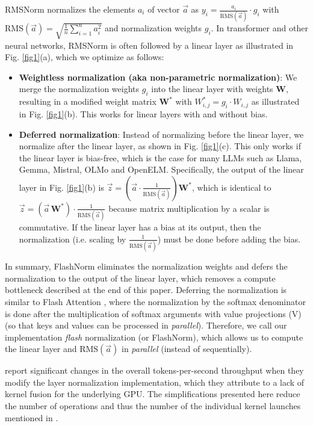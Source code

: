 \documentclass{article}
\newcommand{\mat}[1]{\mathbf{#1}}     %
\def\rms{\text{RMS}(\vec{a})}         %
\def\f1n{\frac{1}{n}}                 %
\def\sas{\sum_{i=1}^n a_i^2}          %
\def\W*{\mat{W}^\ast}                 %
\def\a{\vec{a}}                       %
\def\vz{\vec{z}}                      %
\begin{document}
RMSNorm \citep{rms} normalizes the elements  $a_i$ of vector $\a$ as $y_i = \frac{a_i}{\rms} \cdot g_i$ with $\rms = \sqrt{\f1n \sas}$ and normalization weights $g_i$. In transformer \citep{vanilla} and other neural networks, RMSNorm is often followed by a linear layer as illustrated in Fig. \ref{fig1}(a), which we optimize as follows:
\begin{itemize}[topsep=-1pt]
  \item \textbf{Weightless normalization (aka non-parametric normalization)}: We merge the normalization weights $g_i$ into the linear layer with weights $\mat{W}$, resulting in a modified weight matrix $\W*$ with $W_{i,j}^\ast = g_i \cdot W_{i,j}$ as illustrated in Fig. \ref{fig1}(b). This works for linear layers with and without bias.
  \item \textbf{Deferred normalization}: Instead of normalizing before the linear layer, we normalize after the linear layer, as shown in Fig. \ref{fig1}(c). This only works if the linear layer is bias-free, which is the case for many LLMs such as Llama, Gemma, Mistral, OLMo and OpenELM. Specifically, the output of the linear layer in Fig. \ref{fig1}(b) is $\vz = \left( \a \cdot \frac{1}{\rms} \right) \W*$, which is identical to $\vz = \left( \a \, \W* \right) \cdot \frac{1}{\rms}$ because matrix multiplication by a scalar is commutative. If the linear layer has a bias at its output, then the normalization (i.e. scaling by $\frac{1}{\rms}$) must be done before adding the bias.
\end{itemize}

In summary, FlashNorm eliminates the normalization weights and defers the normalization to the output of the linear layer, which removes a compute bottleneck described at the end of this paper. Deferring the normalization is similar to Flash Attention \citep{flash-attention}, where the normalization by the softmax denominator is done after the multiplication of softmax arguments with value projections (V) (so that keys and values can be processed in \emph{parallel}). Therefore, we call our implementation \emph{flash} normalization (or FlashNorm), which allows us to compute the linear layer and $\rms$ in \emph{parallel} (instead of sequentially).

\citeauthor{openelm} report significant changes in the overall tokens-per-second throughput when they modify the layer normalization implementation, which they attribute to a lack of kernel fusion for the underlying GPU. The simplifications presented here reduce the number of operations and thus the number of the individual kernel launches mentioned in \citep{openelm}.
\end{document}
